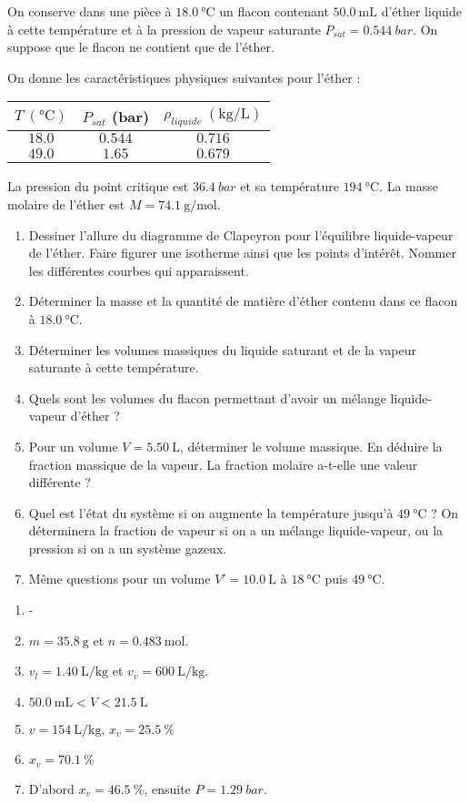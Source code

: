 On conserve dans une pièce à $\SI{18.0}{\degreeCelsius}$ un flacon contenant $\SI{50.0}{\milli\liter}$ d'éther liquide à cette température et à la pression de vapeur saturante $P_{sat} = \SI{0.544}{bar}$. On suppose que le flacon ne contient que de l'éther.

On donne les caractéristiques physiques suivantes pour l'éther : 

\begin{tabular}{|c|c|c|}
	\hline
	$T~(\unit{\degreeCelsius})$ & $P_{sat}$ (bar) & $\rho_{liquide}~(\unit{\kilogram\per\liter})$ \\ \hline
	$18.0$ & $0.544$ & $0.716$ \\ \hline
	$49.0$ & $1.65$ & $0.679$ \\ \hline
\end{tabular}

La pression du point critique est $\SI{36.4}{bar}$ et sa température $\SI{194}{\degreeCelsius}$. La masse molaire de l'éther est $M = \SI{74.1}{\gram\per\mole}$.

\begin{enumerate}
	\item Dessiner l'allure du diagramme de Clapeyron pour l'équilibre liquide-vapeur de l'éther. Faire figurer une isotherme ainsi que les points d'intérêt. Nommer les différentes courbes qui apparaissent.
	\item Déterminer la masse et la quantité de matière d'éther contenu dans ce flacon à $\SI{18.0}{\degreeCelsius}$.
	\item Déterminer les volumes massiques du liquide saturant et de la vapeur saturante à cette température. 
	\item Quels sont les volumes du flacon permettant d'avoir un mélange liquide-vapeur d'éther ?
	\item Pour un volume $V = \SI{5.50}{\liter}$, déterminer le volume massique. En déduire la fraction massique de la vapeur. La fraction molaire a-t-elle une valeur différente ?
	\item Quel est l'état du système si on augmente la température jusqu'à $\SI{49}{\degreeCelsius}$ ? On déterminera la fraction de vapeur si on a un mélange liquide-vapeur, ou la pression si on a un système gazeux.
	\item Même questions pour un volume $V' = \SI{10.0}{\liter}$ à $\SI{18}{\degreeCelsius}$ puis $\SI{49}{\degreeCelsius}$.
\end{enumerate}

\begin{enumerate}
	\item -
	\item $m = \SI{35.8}{\gram}$ et $n = \SI{0.483}{\mole}$.
	\item $v_l = \SI{1.40}{\liter\per\kilogram}$ et $v_v = \SI{600}{\liter\per\kilogram}$.
	\item $\SI{50.0}{\milli\liter} < V < \SI{21.5}{\liter}$
	\item $v = \SI{154}{\liter\per\kilogram}$, $x_v = \SI{25.5}{\percent}$
	\item $x_v = \SI{70.1}{\percent}$
	\item D'abord $x_v = \SI{46.5}{\percent}$, ensuite $P = \SI{1.29}{bar}$.
\end{enumerate}